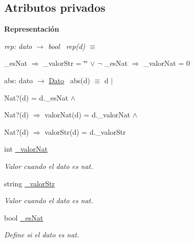 \subsection*{Atributos privados}
\begin{Indent}\textbf{ Representación}\par
{\em rep\+: dato $\to$ bool~\newline
rep(d) $\equiv$
\begin{DoxyItemize}
\item \+\_\+es\+Nat $\Rightarrow$ \+\_\+valor\+Str = \char`\"{}\char`\"{} $\lor$ $\lnot$ \+\_\+es\+Nat $\Rightarrow$ \+\_\+valor\+Nat = 0
\end{DoxyItemize}

abs\+: dato $\to$ \mbox{\hyperlink{classDato}{Dato}}~\newline
abs(d) $\equiv$ d\textquotesingle{} $|$
\begin{DoxyItemize}
\item Nat?(d\textquotesingle{}) = d.\+\_\+es\+Nat $\land$
\item Nat?(d\textquotesingle{}) $\Rightarrow$ valor\+Nat(d) = d.\+\_\+valor\+Nat $\land$
\item Nat?(d\textquotesingle{}) $\Rightarrow$ valor\+Str(d) = d.\+\_\+valor\+Str 
\end{DoxyItemize}}\begin{DoxyCompactItemize}
\item 
\mbox{\label{classDato_a117b034b0acbfb4b602ab5445855f3f1}} 
int \mbox{\hyperlink{classDato_a117b034b0acbfb4b602ab5445855f3f1}{\+\_\+valor\+Nat}}
\begin{DoxyCompactList}\small\item\em Valor cuando el dato es nat. \end{DoxyCompactList}\item 
\mbox{\label{classDato_a4abdad075253c04b649282227a01bbed}} 
string \mbox{\hyperlink{classDato_a4abdad075253c04b649282227a01bbed}{\+\_\+valor\+Str}}
\begin{DoxyCompactList}\small\item\em Valor cuando el dato es nat. \end{DoxyCompactList}\item 
\mbox{\label{classDato_a43a0578f47ccb55da86088491f862bf9}} 
bool \mbox{\hyperlink{classDato_a43a0578f47ccb55da86088491f862bf9}{\+\_\+es\+Nat}}
\begin{DoxyCompactList}\small\item\em Define si el dato es nat. \end{DoxyCompactList}\end{DoxyCompactItemize}
\end{Indent}
